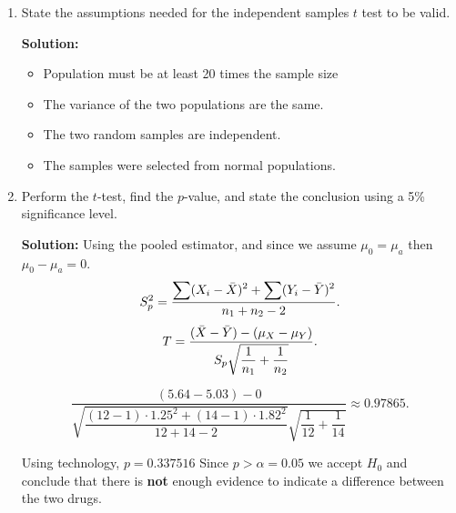 \begin{enumerate}
    \item State the assumptions needed for the independent samples $t$ test to be valid.
    \begin{mybox}
        \textbf{Solution:}
        \begin{itemize}
            \item Population must be at least 20 times the sample size
            \item The variance of the two populations are the same.
            \item The two random samples are independent.
            \item The samples were selected from normal populations.
        \end{itemize}
        
    \end{mybox}
    \newpage
    \item Perform the $t$-test, find the $p$-value, and state the conclusion using a 5\% significance level.
    \begin{mybox}
        \textbf{Solution:} Using the pooled estimator, and since we assume $\mu_0 = \mu_a$ then $\mu_0 - \mu_a = 0$.
        $$S_p^2 = \dfrac{\displaystyle \sum(X_i - \bar{X})^2 + \sum(Y_i-\bar{Y})^2}{n_1 + n_2 -2}.$$
        $$T = \dfrac{(\bar{X}-\bar{Y})-(\mu_X-\mu_Y)}{S_p \displaystyle \sqrt{\dfrac{1}{n_1} + \dfrac{1}{n_2}}}.$$

            $$\displaystyle \frac{\left(5.64-5.03\right)-0}{\sqrt{\dfrac{\left(12-1\right)\cdot 1.25^2+\left(14-1\right)\cdot 1.82^2}{12+14-2}}\sqrt{\dfrac{1}{12}+\dfrac{1}{14}}} \approx 0.97865.$$
            
            \nl Using technology, $p = 0.337516$ Since $p > \alpha = 0.05$ we accept $H_0$ and conclude that there is \textbf{not} enough evidence to indicate a difference between the two drugs.


\end{mybox}
\end{enumerate}
